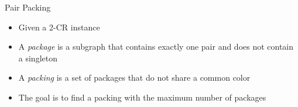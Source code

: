 \begin{frame}{Pair Packing}
\begin{itemize}


\item 
Given a 2-CR instance

\pause\item
A \emph{package} 
is a subgraph that contains exactly one pair and does not contain a singleton 
 
\pause\item
A \emph{packing} is a set of packages that do not share a common color

\pause\item
The goal is to find a packing with the maximum number of packages 


\end{itemize}
\end{frame}